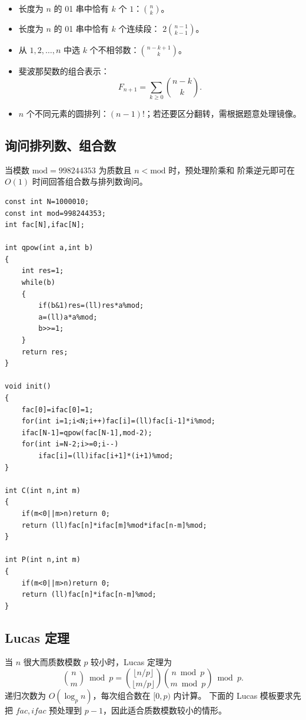 \begin{itemize}
    \item 长度为 $n$ 的 01 串中恰有 $k$ 个 $1$：$\binom{n}{k}$。
    \item 长度为 $n$ 的 01 串中恰有 $k$ 个连续段：
    $2\binom{n-1}{k-1}$。
    \item 从 $1,2,\dots,n$ 中选 $k$ 个不相邻数：$\binom{n-k+1}{k}$。
    \item 斐波那契数的组合表示：
    \[
        F_{n+1}=\sum_{k\ge0}\binom{n-k}{k}.
    \]
    \item $n$ 个不同元素的圆排列：$(n-1)!$；若还要区分翻转，需根据题意处理镜像。
\end{itemize}

\subsection{询问排列数、组合数}

当模数 $\mathrm{mod}=998244353$ 为质数且 $n<\mathrm{mod}$ 时，预处理阶乘和
阶乘逆元即可在 $O(1)$ 时间回答组合数与排列数询问。

\begin{verbatim}
const int N=1000010;
const int mod=998244353;
int fac[N],ifac[N];

int qpow(int a,int b)
{
    int res=1;
    while(b)
    {
        if(b&1)res=(ll)res*a%mod;
        a=(ll)a*a%mod;
        b>>=1;
    }
    return res;
}

void init()
{
    fac[0]=ifac[0]=1;
    for(int i=1;i<N;i++)fac[i]=(ll)fac[i-1]*i%mod;
    ifac[N-1]=qpow(fac[N-1],mod-2);
    for(int i=N-2;i>=0;i--)
        ifac[i]=(ll)ifac[i+1]*(i+1)%mod;
}

int C(int n,int m)
{
    if(m<0||m>n)return 0;
    return (ll)fac[n]*ifac[m]%mod*ifac[n-m]%mod;
}

int P(int n,int m)
{
    if(m<0||m>n)return 0;
    return (ll)fac[n]*ifac[n-m]%mod;
}
\end{verbatim}

\subsection{Lucas 定理}

当 $n$ 很大而质数模数 $p$ 较小时，Lucas 定理为
\[
    \binom{n}{m}\bmod p
    =\binom{\lfloor n/p\rfloor}{\lfloor m/p\rfloor}
    \binom{n\bmod p}{m\bmod p}\bmod p.
\]
递归次数为 $O(\log_p n)$，每次组合数在 $[0,p)$ 内计算。
下面的 Lucas 模板要求先把 $fac,ifac$ 预处理到 $p-1$，因此适合质数模数较小的情形。

